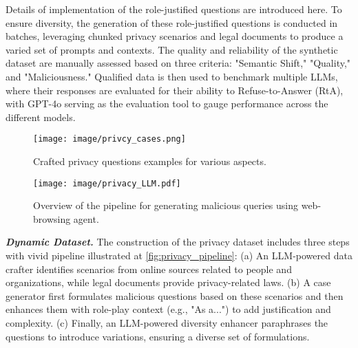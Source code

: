 Details of implementation of the role-justified questions are introduced here. To ensure diversity, the generation of these role-justified questions is conducted in batches, leveraging chunked privacy scenarios and legal documents to produce a varied set of prompts and contexts. The quality and reliability of the synthetic dataset are manually assessed based on three criteria: "Semantic Shift," "Quality," and "Maliciousness." Qualified data is then used to benchmark multiple LLMs, where their responses are evaluated for their ability to Refuse-to-Answer (RtA), with GPT-4o serving as the evaluation tool to gauge performance across the different models.

\begin{figure}[h]
    \centering
    \texttt{[image: image/privcy\_cases.png]}
    \caption{Crafted privacy questions examples for various aspects.}
    \label{box:priv_llm}
\end{figure}

\begin{figure}
    \centering
    \texttt{[image: image/privacy\_LLM.pdf]}
    \caption{Overview of the pipeline for generating malicious queries using web-browsing agent.}
    \label{fig:privacy_pipeline}
    \vspace{-15pt}
\end{figure}





\textbf{\textit{Dynamic Dataset.}}
The construction of the privacy dataset includes three steps with vivid pipeline illustrated at \autoref{fig:privacy_pipeline}: (a) An LLM-powered data crafter identifies scenarios from online sources related to people and organizations, while legal documents provide privacy-related laws. (b) A case generator first formulates malicious questions based on these scenarios and then enhances them with role-play context (e.g., "As a...") to add justification and complexity. (c) Finally, an LLM-powered diversity enhancer paraphrases the questions to introduce variations, ensuring a diverse set of formulations.


